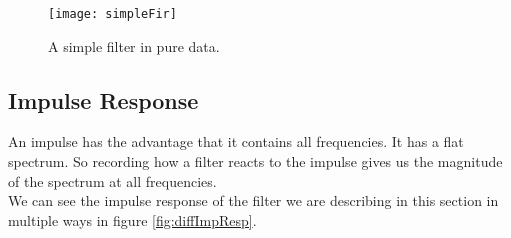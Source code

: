 \begin{figure}[H]
	\centering
	\texttt{[image: simpleFir]}
	\caption[FIR filter in pd]
	{A simple filter in pure data.}
	\label{fig:pdSimpleFir}
\end{figure}


\subsection{Impulse Response}

An impulse has the advantage that it contains all frequencies. It has a flat spectrum.  So recording how a filter reacts to the impulse gives us the magnitude of the spectrum at all frequencies.\\
We can see the impulse response of the filter we are describing in this section in  multiple ways in figure \ref{fig:diffImpResp}.










